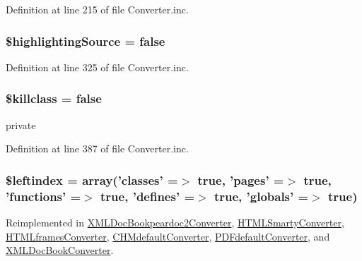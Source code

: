 \-Definition at line 215 of file \-Converter.\-inc.

\hypertarget{class_converter_a272c13ae598060163f6e8749a4c12904}{
\subsubsection[{\$highlighting\-Source}]{\setlength{\rightskip}{0pt plus 5cm}\$highlighting\-Source = false}}\label{class_converter_a272c13ae598060163f6e8749a4c12904}


\-Definition at line 325 of file \-Converter.\-inc.

\hypertarget{class_converter_a67455ac1c751cd5e5b977f7153c037fa}{
\subsubsection[{\$killclass}]{\setlength{\rightskip}{0pt plus 5cm}\$killclass = false}}\label{class_converter_a67455ac1c751cd5e5b977f7153c037fa}
private 

\-Definition at line 387 of file \-Converter.\-inc.

\hypertarget{class_converter_ab49669c749559bb7833762878adb8f0c}{
\subsubsection[{\$leftindex}]{\setlength{\rightskip}{0pt plus 5cm}\$leftindex = array('classes' =$>$ true, 'pages' =$>$ true, 'functions' =$>$ true, 'defines' =$>$ true, 'globals' =$>$ true)}}\label{class_converter_ab49669c749559bb7833762878adb8f0c}


\-Reimplemented in \hyperlink{class_x_m_l_doc_bookpeardoc2_converter_ab49669c749559bb7833762878adb8f0c}{\-X\-M\-L\-Doc\-Bookpeardoc2\-Converter}, \hyperlink{class_h_t_m_l_smarty_converter_ab49669c749559bb7833762878adb8f0c}{\-H\-T\-M\-L\-Smarty\-Converter}, \hyperlink{class_h_t_m_lframes_converter_ab49669c749559bb7833762878adb8f0c}{\-H\-T\-M\-Lframes\-Converter}, \hyperlink{class_c_h_mdefault_converter_ab49669c749559bb7833762878adb8f0c}{\-C\-H\-Mdefault\-Converter}, \hyperlink{class_p_d_fdefault_converter_ab49669c749559bb7833762878adb8f0c}{\-P\-D\-Fdefault\-Converter}, and \hyperlink{class_x_m_l_doc_book_converter_ab49669c749559bb7833762878adb8f0c}{\-X\-M\-L\-Doc\-Book\-Converter}.



